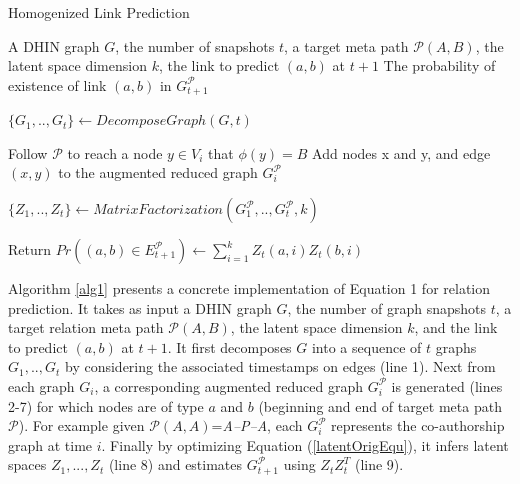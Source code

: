  



\begin{algorithm}[t]
\caption{Homogenized Link Prediction}\label{alg1}
\begin{algorithmic}[1]\scriptsize
\REQUIRE A DHIN graph $G$, the number of snapshots $t$, a target meta path $\mathcal{P}(A,B)$, the latent space dimension $k$, the link to predict $(a,b)$ at $t+1$
\ENSURE The probability of existence of link $(a,b)$ in $G^\mathcal{P}_{t+1}$

\STATE $\{G_1, .., G_t\} \leftarrow DecomposeGraph(G, t)$

    
        \STATE Follow $\mathcal{P}$ to reach a node $y\in V_i$ that $\phi(y)=B$%
        \STATE Add nodes x and y, and edge $(x,y)$ to the augmented reduced graph $G_i^\mathcal{P}$ 
\ENDFOR

\ENDFOR

\STATE $\{Z_1, .., Z_t\} \leftarrow MatrixFactorization(G^\mathcal{P}_1, .., G^\mathcal{P}_t, k)$

\STATE Return $Pr((a,b)\in E^\mathcal{P}_{t+1}) \leftarrow \sum_{i=1}^{k} Z_t(a,i)Z_t(b,i)$


\end{algorithmic}
\end{algorithm}




Algorithm \ref{alg1}  presents a concrete implementation of Equation 1 for relation prediction. It takes as input a DHIN graph $G$, the number of graph snapshots $t$, a target relation meta path $\mathcal{P}(A,B)$, the latent space dimension $k$, and the link to predict $(a,b)$ at $t+1$. It first decomposes $G$ into a sequence of $t$ graphs $G_1, .., G_t$ by considering the associated timestamps on edges (line 1). Next from each graph $G_i$, a corresponding augmented reduced graph $G^\mathcal{P}_i$ is generated (lines 2-7) for which nodes are of type $a$ and $b$ (beginning and end of target  meta path $\mathcal{P}$). For example given $\mathcal{P}(A,A)$=\textit{A--P--A}, each $G^\mathcal{P}_i$ represents the co-authorship graph at time $i$. Finally by optimizing Equation (\ref{latentOrigEqu}), it infers latent spaces $Z_1, ...,Z_t$ (line 8) and estimates $G^\mathcal{P}_{t+1}$ using $Z_tZ_t^T$ (line 9). 




